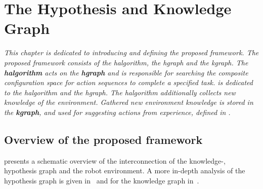

\chapter{The Hypothesis and Knowledge Graph}%
\label{chap:hgraph_and_kgraph}

\textit{This chapter is dedicated to introducing and defining the proposed framework. The proposed framework consists of the \acl{halgorithm}, the \acl{hgraph} and the \acl{kgraph}. The \textbf{\acf{halgorithm}} acts on the \textbf{\acf{hgraph}} and is responsible for searching the composite configuration space for action sequences to complete a specified task.  is dedicated to the \ac{halgorithm} and the \ac{hgraph}. The \ac{halgorithm} additionally collects new knowledge of the environment. Gathered new environment knowledge is stored in the \textbf{\acl{kgraph}}, and used for suggesting actions from experience, defined in .\bs}

\section{Overview of the proposed framework}
 presents a schematic overview of the interconnection of the knowledge-, hypothesis graph and the robot environment. A more in-depth analysis of the hypothesis graph is given in~ and for the knowledge graph in~.\bs

